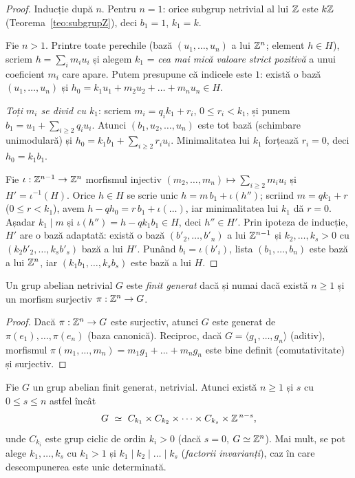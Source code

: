 \begin{proof}
Inducție după $n$. Pentru $n=1$: orice subgrup netrivial al lui $\mathbb{Z}$ este $k\mathbb{Z}$ (Teorema~\ref{teo:subgrupZ}), deci $b_1=1$, $k_1=k$.

Fie $n>1$. Printre toate perechile (bază $(u_1,\dots,u_n)$ a lui $\mathbb{Z}^n$; element $h\in H$), scriem $h=\sum_i m_iu_i$ și alegem $k_1$ = \emph{cea mai mică valoare strict pozitivă} a unui coeficient $m_i$ care apare. Putem presupune că indicele este $1$: există o bază $(u_1,\dots,u_n)$ și $h_0=k_1u_1+m_2u_2+\dots+m_nu_n\in H$.

\emph{Toți $m_i$ se divid cu $k_1$}: scriem $m_i=q_ik_1+r_i$, $0\le r_i<k_1$, și punem $b_1=u_1+\sum_{i\ge2}q_iu_i$. Atunci $(b_1,u_2,\dots,u_n)$ este tot bază (schimbare unimodulară) și $h_0=k_1b_1+\sum_{i\ge2}r_iu_i$. Minimalitatea lui $k_1$ forțează $r_i=0$, deci $h_0=k_1b_1$.

Fie $\iota:\mathbb{Z}^{n-1}\to\mathbb{Z}^n$ morfismul injectiv $(m_2,\dots,m_n)\mapsto\sum_{i\ge2}m_iu_i$ și $H'=\iota^{-1}(H)$. Orice $h\in H$ se scrie unic $h=m\,b_1+\iota(h'')$; scriind $m=qk_1+r$ ($0\le r<k_1$), avem $h-qh_0=r\,b_1+\iota(\dots)$, iar minimalitatea lui $k_1$ dă $r=0$. Așadar $k_1\mid m$ și $\iota(h'')=h-qk_1b_1\in H$, deci $h''\in H'$. Prin ipoteza de inducție, $H'$ are o bază adaptată: există o bază $(b'_2,\dots,b'_n)$ a lui $\mathbb{Z}^{n-1}$ și $k_2,\dots,k_s>0$ cu $(k_2b'_2,\dots,k_sb'_s)$ bază a lui $H'$. Punând $b_i=\iota(b'_i)$, lista $(b_1,\dots,b_n)$ este bază a lui $\mathbb{Z}^n$, iar $(k_1b_1,\dots,k_sb_s)$ este bază a lui $H$.
\end{proof}

\begin{lema}\label{lema:fg}
Un grup abelian netrivial $G$ este \emph{finit generat} dacă și numai dacă există $n\ge1$ și un morfism surjectiv $\pi:\mathbb{Z}^n\to G$.
\end{lema}

\begin{proof}
Dacă $\pi:\mathbb{Z}^n\to G$ este surjectiv, atunci $G$ este generat de $\pi(e_1),\dots,\pi(e_n)$ (baza canonică). Reciproc, dacă $G=\langle g_1,\dots,g_n\rangle$ (aditiv), morfismul $\pi(m_1,\dots,m_n)=m_1g_1+\dots+m_ng_n$ este bine definit (comutativitate) și surjectiv.
\end{proof}

\begin{teorema}\label{teo:structura}
Fie $G$ un grup abelian finit generat, netrivial. Atunci există $n\ge1$ și $s$ cu $0\le s\le n$ astfel încât
\[
G\ \simeq\ C_{k_1}\times C_{k_2}\times\dots\times C_{k_s}\times\mathbb{Z}^{\,n-s},
\]
unde $C_{k_i}$ este grup ciclic de ordin $k_i>0$ (dacă $s=0$, $G\simeq\mathbb{Z}^n$). Mai mult, se pot alege $k_1,\dots,k_s$ cu $k_1>1$ și $k_1\mid k_2\mid\dots\mid k_s$ (\emph{factorii invarianți}), caz în care descompunerea este unic determinată.
\end{teorema}

